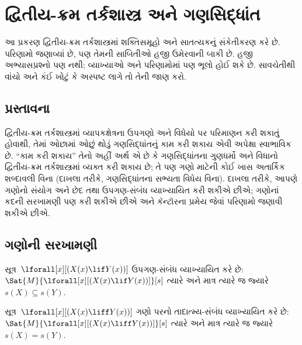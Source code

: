 \section{દ્વિતીય-ક્રમ તર્કશાસ્ત્ર અને ગણસિદ્ધાંત}

\begin{editorial}
આ પ્રકરણ દ્વિતીય-ક્રમ તર્કશાસ્ત્રમાં શક્તિસમૂહો અને સાતત્યકનું
સંકેતીકરણ કરે છે. પરિણામો જણાવ્યાં છે, પણ તેમની સાબિતીઓ હજી
ઉમેરવાની બાકી છે. હજી અભ્યાસપ્રશ્નો પણ નથી; વ્યાખ્યાઓ અને પરિણામોમાં
પણ ભૂલો હોઈ શકે છે. સાવચેતીથી વાંચો અને કંઈ ખોટું કે અસ્પષ્ટ લાગે
તો તેની જાણ કરો.
\end{editorial}















\subsection{પ્રસ્તાવના}\label{sol:set:int:sec}

દ્વિતીય-ક્રમ તર્કશાસ્ત્રમાં વ્યાપકક્ષેત્રના ઉપગણો અને વિધેયો પર
પરિમાણન કરી શકાતું હોવાથી, તેમાં ઓછામાં ઓછું થોડું ગણસિદ્ધાંતનું
કામ કરી શકાય એવી અપેક્ષા સ્વાભાવિક છે. ``કામ કરી શકાય'' તેનો અહીં
અર્થ એ છે કે ગણસિદ્ધાંતના ગુણધર્મો અને વિધાનો દ્વિતીય-ક્રમ
તર્કશાસ્ત્રમાં વ્યક્ત કરી શકાય છે; તે પણ ગણો માટેની કોઈ ખાસ
અતાર્કિક શબ્દાવલી વિના (દાખલા તરીકે, ગણસિદ્ધાંતના સભ્યતા
વિધેય વિના). દાખલા તરીકે, આપણે ગણોનો સંયોગ અને છેદ તથા
ઉપગણ-સંબંધ વ્યાખ્યાયિત કરી શકીએ છીએ; ગણોનાં કદની સરખામણી પણ કરી
શકીએ છીએ અને કૅન્ટૉરના પ્રમેય જેવાં પરિણામો જણાવી શકીએ છીએ.





\subsection{ગણોની સરખામણી}\label{sol:set:cmp:sec}

\begin{prop}
સૂત્ર~$\lforall[x][(X(x) \lif Y(x))]$ ઉપગણ-સંબંધ
વ્યાખ્યાયિત કરે છે: $\Sat{M}{\lforall[x][(X(x) \lif Y(x))]}[s]$
ત્યારે અને માત્ર ત્યારે જ જ્યારે $s(X) \subseteq s(Y)$.
\end{prop}

\begin{prop}
સૂત્ર~$\lforall[x][(X(x) \liff Y(x))]$ ગણો પરનો
તાદાત્મ્ય-સંબંધ વ્યાખ્યાયિત કરે છે: $\Sat{M}{\lforall[x][(X(x)
\liff Y(x))]}[s]$ ત્યારે અને માત્ર ત્યારે જ જ્યારે $s(X) = s(Y)$.
\end{prop}

